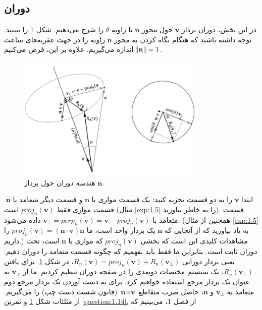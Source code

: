 \subsection{\textbf{دوران}}
\label{subsec:3.1.4}
{
    \Large
    \begin{spacing}{1.5}
        در این بخش، دوران بردار $\textbf{v}$ حول محور $\textbf{n}$ با زاویه $\theta$ را شرح می‌دهیم.
        شکل \ref{fig:4.Session.1.3.3} را ببینید.
        توجه داشته باشید که هنگام نگاه کردن به محور $\textbf{n}$ زاویه را در جهت عقربه‌های ساعت اندازه می‌گیریم.
        علاوه بر این، فرض می‌کنیم $\norm{\textbf{n}}=1$.

        \begin{figure}[H]
            \centering
            \setlength{\belowcaptionskip}{-10pt}
            \includegraphics[width=0.8\textwidth]{Images/4/3/4.Session.1.3.3}
            \caption {هندسه دوران حول بردار $\textbf{n}$.}
            \label{fig:4.Session.1.3.3}
        \end{figure}

        ابتدا $\textbf{v}$ را به دو قسمت تجزیه کنید:
        یک قسمت موازی با $\textbf{n}$ و قسمت دیگر متعامد با $\textbf{n}$.
        قسمت موازی فقط $proj_{n}(\textbf{v})$ است (مثال \ref{exp:1.5} را به خاطر بیاورید).
        قسمت متعامد با $\textbf{v}_{\perp}=perp_{n}(\textbf{v})=\textbf{v}-proj_{n}(\textbf{v})$ داده می‌شود.
        (همچنین از مثال \ref{exp:1.5} به یاد بیاورید که از آنجایی که $\textbf{n}$ یک بردار واحد است، ما $proj_{n}(\textbf{v})= (\textbf{n}\cdot\textbf{v})\textbf{n}$ را داریم.)
        مشاهدات کلیدی این است که بخشی $proj_{n}(\textbf{v})$ که موازی با $\textbf{n}$ است، تحت دوران ثابت است.
        بنابراین ما فقط باید بفهمیم که چگونه قسمت متعامد را دوران دهیم. یعنی بردار دورانی $R_{n}(\textbf{v})=proj_{n}(\textbf{v})+R_{n}(\textbf{v}_{\perp})$، در شکل \ref{fig:4.Session.1.3.3}.
        برای یافتن $R_{n}(\textbf{v}_{\perp})$، یک سیستم مختصات دوبعدی را در صفحه دوران تنظیم کردیم.
        ما از $\textbf{v}_{\perp}$ به عنوان یک بردار مرجع استفاده خواهیم کرد.
        برای به دست آوردن یک بردار مرجع دوم متعامد به $\textbf{v}_{\perp}$ و $\textbf{n}$،
        حاصل ضرب متقاطع $\textbf{n}\times\textbf{v}$ (قانون شست دست چپ) را می‌گیریم. از مثلثات شکل \ref{fig:4.Session.1.3.3} و تمرین \hyperref[question:1.14]{\ref{question:1.14}.} از فصل 1، می‌بینیم که


\end{spacing}}
